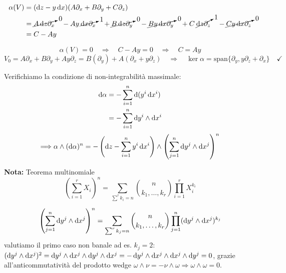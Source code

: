 \begin{align*}
    \alpha(V) & = (\odif{z} - y \odif{x}) (A \partial_x + B \partial_y + C \partial_z)                                                                                                                                                                                                        \\
              & = \cancelto{0}{A \odif{z} \partial_x} \quad - A y \: \cancelto{1}{\odif{x} \partial_x} \quad + \cancelto{0}{B \odif{z} \partial_y} \quad - \cancelto{0}{B y \odif{x} \partial_y} \quad + C \: \cancelto{1}{\odif{z} \partial_z} \quad - \cancelto{0}{C y \odif{x} \partial_z} \\
              & = C - Ay
\end{align*}

\begin{equation*}
    \alpha(V) = 0 \quad \Longrightarrow \quad C - Ay = 0 \quad \Longrightarrow \quad C = Ay
\end{equation*}
\begin{equation*}
    V_0 = A \partial_x + B \partial_y + A y \partial_z = B(\partial_y) + A(\partial_x + y \partial_z) \quad \Longrightarrow \quad \ker \alpha = \text{span}\{\partial_y, y \partial_z + \partial_x\} \quad \checkmark
\end{equation*}

Verifichiamo la condizione di non-integrabilità massimale:
\begin{align*}
    \odif{\alpha} & = - \sum_{i=1}^{n} \odif{(y^i \odif{x^i})}      \\
                  & = - \sum_{i=1}^{n} \odif{y^i} \wedge \odif{x^i}
\end{align*}
\begin{equation*}
    \Longrightarrow \alpha \wedge (\odif{\alpha})^n = -\left(\odif{z} - \sum_{i=1}^{n} y^i \odif{x^i}\right) \wedge \left(\sum_{j=1}^{n} \odif{y^j} \wedge \odif{x^j}\right)^n
\end{equation*}

\noindent \textbf{Nota:} Teorema multinomiale
\begin{equation*}
    \left(\sum_{i=1}^{r} X_i\right)^n = \sum_{\sum^r k_i = n} \binom{n}{k_1, \dots, k_r} \prod_{i=1}^{r} X_i^{k_i}
\end{equation*}

\begin{equation*}
    \left(\sum_{j=1}^{n} \odif{y^j} \wedge \odif{x^j}\right)^n = \sum_{\sum^r k_j = n} \binom{n}{k_1, \dots, k_r} \prod_{j=1}^{n} (\odif{y^j} \wedge \odif{x^j})^{k_j}
\end{equation*}
valutiamo il primo caso non banale ad es. $k_j = 2$: $(\odif{y^j} \wedge \odif{x^j})^2 = \odif{y^j} \wedge \odif{x^j} \wedge \odif{y^j} \wedge \odif{x^j} = - \odif{y^j} \wedge \odif{x^j} \wedge \odif{x^j} \wedge \odif{y^j} = 0$, grazie all'anticommutatività del prodotto wedge \(\omega \wedge \nu = - \nu \wedge \omega \Longrightarrow \omega \wedge \omega = 0\).

